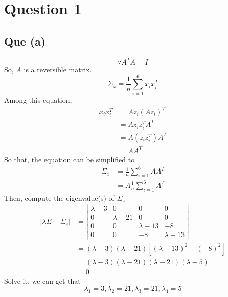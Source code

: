 \documentclass[12pt, letterpaper]{article}
\begin{document}
\section*{Question 1}

\subsection*{Que (a)}
\begin{equation}
	\because A^TA=I
\end{equation}
So, $A$ is a reversible matrix.
\begin{equation}
	\Sigma_x=\frac1n\sum^6_{i=1}x_ix_i^T
\end{equation}
Among this equation, 
\begin{equation*}
\begin{align}
	x_ix_i^T
	&= Az_i(Az_i)^T\\
	&= Az_iz_i^TA^T\\
	&= A(z_iz_i^T)A^T\\
	&= AA^T
\end{align}
\end{equation*}
So that, the equation can be simplified to
\begin{equation}
\begin{align}
	\Sigma_x
	&= \frac1n\sum^6_{i=1}AA^T\\
	&= A\frac1n\sum^6_{i=1}A^T
\end{align}
\end{equation}
Then, compute the eigenvalue(s) of $\Sigma_z$
\begin{equation}
\begin{align}
	|\lambda E-\Sigma_z|
	&= \left|\begin{array}{cccc}
		\lambda-3 & 0 & 0 & 0 \\
		0 & \lambda-21 & 0 & 0 \\
		0 & 0 & \lambda-13 & -8 \\
		0 & 0 & -8 & \lambda-13 
	\end{array}\right|\\
	&= (\lambda-3)(\lambda-21)[(\lambda-13)^2-(-8)^2]\\
	&= (\lambda-3)(\lambda-21)(\lambda-21)(\lambda-5)\\
	&=0
\end{align}
\end{equation}
Solve it, we can get that
\begin{equation}
	\lambda_1=3,
	\lambda_2=21,
	\lambda_3=21,
	\lambda_4=5
\end{equation}
\end{document}
